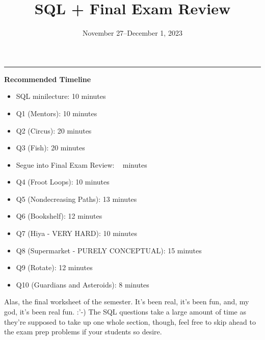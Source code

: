 \documentclass{exam}
\title{SQL + Final Exam Review}
\date{November 27--December 1, 2023}
\begin{document}
\maketitle\rule{\textwidth}{0.15em}

\begin{guide}

    \textbf{Recommended Timeline}
    \begin{itemize}
        \item SQL minilecture: 10 minutes
        \item Q1 (Mentors): 10 minutes
        \item Q2 (Circus): 20 minutes
        \item Q3 (Fish): 20 minutes
        \item Segue into Final Exam Review: ~ minutes
        \item Q4 (Froot Loops): 10 minutes
        \item Q5 (Nondecreasing Paths): 13 minutes
        \item Q6 (Bookshelf): 12 minutes
        \item Q7 (Hiya - VERY HARD): 10 minutes
        \item Q8 (Supermarket - PURELY CONCEPTUAL): 15 minutes
        \item Q9 (Rotate): 12 minutes
        \item Q10 (Guardians and Asteroids): 8 minutes
    \end{itemize}

    Alas, the final worksheet of the semester. It's been real, it's been fun, and, my god, it's been real fun. :'-) The SQL questions take a large amount of time as they're supposed to take up one whole section, though, feel free to skip ahead to the exam prep problems if your students so desire.

\end{guide}

\end{document}
